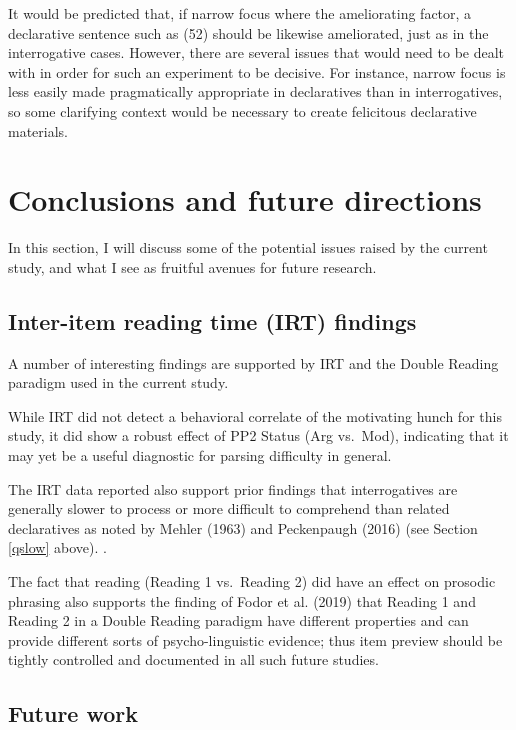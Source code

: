 \documentclass[11pt,oneside]{book}
\begin{document}
It would be predicted that, if narrow focus where the ameliorating factor, a declarative sentence such as (52) should be likewise ameliorated, just as in the interrogative cases. However, there are several issues that would need to be dealt with in order for such an experiment to be decisive. For instance, narrow focus is less easily made pragmatically appropriate in declaratives than in interrogatives, so some clarifying context would be necessary to create felicitous declarative materials.

\hypertarget{confound}{%
\section{Conclusions and future directions}\label{confound}}

In this section, I will discuss some of the potential issues raised by the current study, and what I see as fruitful avenues for future research.

\hypertarget{inter-item-reading-time-irt-findings}{%
\subsection{Inter-item reading time (IRT) findings}\label{inter-item-reading-time-irt-findings}}

A number of interesting findings are supported by IRT and the Double Reading paradigm used in the current study.

While IRT did not detect a behavioral correlate of the motivating hunch for this study, it did show a robust effect of PP2 Status (Arg vs.~Mod), indicating that it may yet be a useful diagnostic for parsing difficulty in general.

The IRT data reported also support prior findings that interrogatives are generally slower to process or more difficult to comprehend than related declaratives as noted by Mehler (1963) and Peckenpaugh (2016) (see Section \ref{qslow} above). .

The fact that reading (Reading 1 vs.~Reading 2) did have an effect on prosodic phrasing also supports the finding of Fodor et al. (2019) that Reading 1 and Reading 2 in a Double Reading paradigm have different properties and can provide different sorts of psycho-linguistic evidence; thus item preview should be tightly controlled and documented in all such future studies.

\hypertarget{future-work}{%
\subsection{Future work}\label{future-work}}
\end{document}
